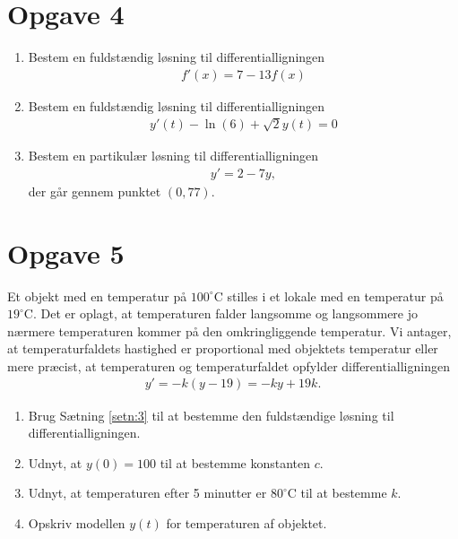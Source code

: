 \section*{Opgave 4}
\begin{enumerate}[label=\roman*)]
	\item Bestem en fuldstændig løsning til differentialligningen 
	\begin{align*}
		f'(x) = 7-13f(x)
	\end{align*}
	\item Bestem en fuldstændig løsning til differentialligningen 
	\begin{align*}
		y'(t) -\ln(6)+\sqrt{2}y(t)=0
	\end{align*}
	\item Bestem en partikulær løsning til differentialligningen 
	\begin{align*}
		y' = 2-7y,
	\end{align*}
	der går gennem punktet $(0,77)$. 
\end{enumerate}

\section*{Opgave 5}
	Et objekt med en temperatur på $100^\circ$C stilles i et lokale med en temperatur på $19^\circ$C. Det er oplagt, at temperaturen falder langsomme og langsommere jo nærmere
	temperaturen kommer på den omkringliggende temperatur. Vi antager, at temperaturfaldets hastighed er proportional med objektets temperatur eller mere præcist, at 
	temperaturen og temperaturfaldet opfylder differentialligningen
	\begin{align*}
		y' = -k(y-19) = -ky+19k.
	\end{align*}
	\begin{enumerate}[label=\roman*)]
		\item Brug Sætning \ref{setn:3} til at bestemme den fuldstændige løsning til differentialligningen. 
		\item Udnyt, at $y(0) = 100$ til at bestemme konstanten $c$. 
		\item Udnyt, at temperaturen efter 5 minutter er $80^\circ$C til at bestemme $k$. 
		\item Opskriv modellen $y(t)$ for temperaturen af objektet. 
	\end{enumerate}